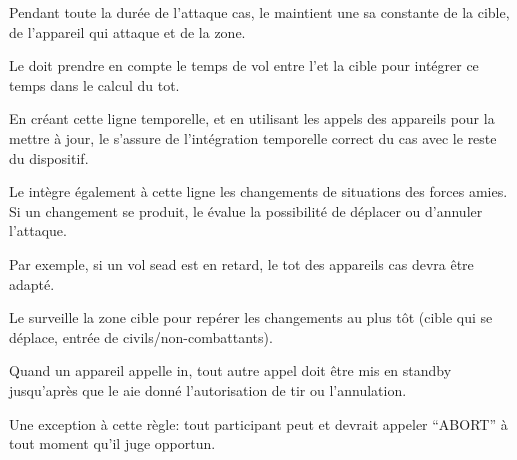 \begin{e1}
	
	\item Pendant toute la durée de l'attaque \gls{cas}, le \ja{} maintient une \gls{sa} constante de la cible, de l'appareil qui attaque et de la zone.
	
	\item Le \ja{} doit prendre en compte le temps de vol entre l'\ipha et la cible pour intégrer ce temps dans le calcul du \gls{tot}.
	
	En créant cette ligne temporelle, et en utilisant les appels des appareils pour la mettre à jour, le \ja{} s'assure de l'intégration temporelle correct du \gls{cas} avec le reste du dispositif.
	
	Le \ja{} intègre également à cette ligne les changements de situations des forces amies. Si un changement se produit, le \ja{} évalue la possibilité de déplacer ou d'annuler l'attaque.
	
	Par exemple, si un vol \gls{sead} est en retard, le \gls{tot} des appareils \gls{cas} devra être adapté.
	
	\item Le \ja{} surveille la zone cible pour repérer les changements au plus tôt (cible qui se déplace, entrée de civils/non-combattants).
	
	
	\begin{e2}
		
		\item Quand un appareil appelle \gls{in}, tout autre appel doit être mis en standby jusqu'après que le \ja{} aie donné l'autorisation de tir ou l'annulation.
		
		Une exception à cette règle: tout participant peut et devrait appeler ``ABORT'' à tout moment qu'il juge opportun.
		
		
	\end{e2}
	

\end{e1}
